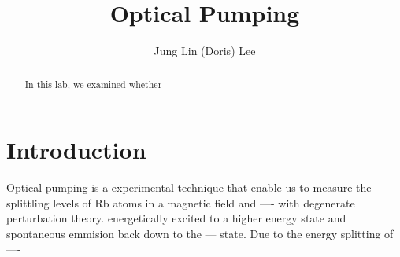 \documentclass[iop,revtex4]{emulateapj_mod}
\begin{document}
\title{Optical Pumping}
\author{Jung Lin (Doris) Lee}
 \begin{abstract}
In this lab, we examined whether 
 \end{abstract}
 \nocite{*}

\section{Introduction}\label{sec:intro}
\par %
Optical pumping is a experimental technique that enable us to measure the ---- splittling levels of Rb atoms in a magnetic field and ---- with degenerate perturbation theory. 
energetically excited to a higher energy state and spontaneous emmision back down to the --- state. Due to the energy splitting of ---- 
\end{document}
